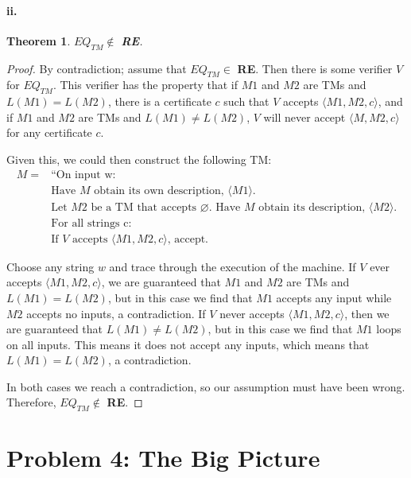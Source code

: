 \documentclass[10pt,letter]{article}
\newtheorem*{thm}{Theorem}
\begin{document}
\paragraph{ii.}
\begin{thm} $EQ_{TM} \not \in $ \textbf{RE}. \end{thm}
\begin{proof} 

By contradiction; assume that $EQ_{TM} \in$ \textbf{RE}. Then there is some verifier $V$ for $EQ_{TM}$. This verifier has the property that if $M1$ and $M2$ are TMs and $L(M1) = L(M2)$, there is a certificate $c$ such that $V$ accepts $\langle M1, M2, c \rangle$, and if $M1$ and $M2$ are TMs and $L(M1) \not = L(M2)$, $V$ will never accept $\langle M, M2, c \rangle$ for any certificate $c$.

Given this, we could then construct the following TM:
\begin{align*}
M = &\text{“On input w:}\\
&\text{Have $M$ obtain its own description, $\langle M1 \rangle$.}\\
&\text{Let $M2$ be a TM that accepts $\varnothing$. Have $M$ obtain its description, $\langle M2 \rangle$.}\\
&\text{For all strings c:}\\
&\text{If $V$ accepts $\langle M1, M2, c \rangle$, accept.}
\end{align*}

Choose any string $w$ and trace through the execution of the machine. If $V$ ever accepts $\langle M1, M2, c \rangle$, we are guaranteed that $M1$ and $M2$ are TMs and $L(M1) = L(M2)$, but in this case we find that $M1$ accepts any input while $M2$ accepts no inputs, a contradiction. If $V$ never accepts $\langle M1, M2, c \rangle$, then we are guaranteed that $L(M1) \not = L(M2)$, but in this case we find that $M1$ loops on all inputs. This means it does not accept any inputs, which means that $L(M1) = L(M2)$, a contradiction.

In both cases we reach a contradiction, so our assumption must have been wrong. Therefore, $EQ_{TM} \not \in$ \textbf{RE}.
\end{proof}

\section*{Problem 4: The Big Picture}
\end{document}
